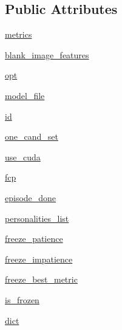 \subsection*{Public Attributes}
\begin{DoxyCompactItemize}
\item 
\hyperlink{classtransresnet_1_1transresnet_1_1TransresnetAgent_a4e676ab7af9358e8c0e04cc306f40988}{metrics}
\item 
\hyperlink{classtransresnet_1_1transresnet_1_1TransresnetAgent_a7acce0d1ac3b941798b35062020746e9}{blank\+\_\+image\+\_\+features}
\item 
\hyperlink{classtransresnet_1_1transresnet_1_1TransresnetAgent_ae8876e2ef775276466938ae79798bc43}{opt}
\item 
\hyperlink{classtransresnet_1_1transresnet_1_1TransresnetAgent_a9e6903b45b3e65adc6e79b439b17af41}{model\+\_\+file}
\item 
\hyperlink{classtransresnet_1_1transresnet_1_1TransresnetAgent_a5cf815f184a1cfe8eaae18581c3df35e}{id}
\item 
\hyperlink{classtransresnet_1_1transresnet_1_1TransresnetAgent_a18a339b0fb262e516723378c612b6f98}{one\+\_\+cand\+\_\+set}
\item 
\hyperlink{classtransresnet_1_1transresnet_1_1TransresnetAgent_ae102526b67781d47a4b622782123748a}{use\+\_\+cuda}
\item 
\hyperlink{classtransresnet_1_1transresnet_1_1TransresnetAgent_a4403985be9a3e072a3499fb1916bafe1}{fcp}
\item 
\hyperlink{classtransresnet_1_1transresnet_1_1TransresnetAgent_aa7e84e53e81b7cca3aaf3ee7c22f049c}{episode\+\_\+done}
\item 
\hyperlink{classtransresnet_1_1transresnet_1_1TransresnetAgent_ad13b2b0e0cd097524df5b6b86fdcf2d6}{personalities\+\_\+list}
\item 
\hyperlink{classtransresnet_1_1transresnet_1_1TransresnetAgent_a3790cb456738e39c9690918c41cc4997}{freeze\+\_\+patience}
\item 
\hyperlink{classtransresnet_1_1transresnet_1_1TransresnetAgent_a1ccb6c2ec5d9d7a77327567145f478e5}{freeze\+\_\+impatience}
\item 
\hyperlink{classtransresnet_1_1transresnet_1_1TransresnetAgent_aa69e2367956bebebe6849c62f958ed68}{freeze\+\_\+best\+\_\+metric}
\item 
\hyperlink{classtransresnet_1_1transresnet_1_1TransresnetAgent_af8c4a6e9f9c26de10f079860a42be44c}{is\+\_\+frozen}
\item 
\hyperlink{classtransresnet_1_1transresnet_1_1TransresnetAgent_a82eb333981adfa8b0fcc7faefe293c30}{dict}

\end{DoxyCompactItemize}
